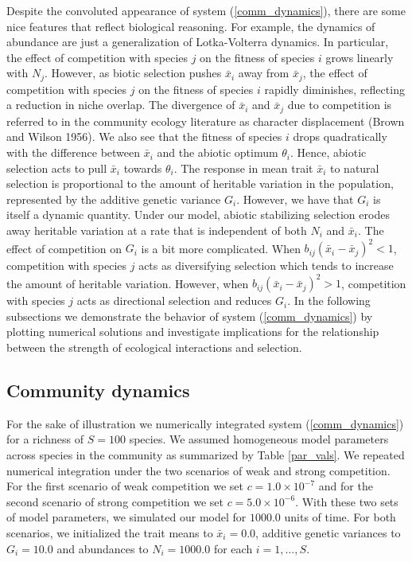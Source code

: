 \documentclass[]{article}
\begin{document}
Despite the convoluted appearance of system (\ref{comm_dynamics}), there
are some nice features that reflect biological reasoning. For example,
the dynamics of abundance are just a generalization of Lotka-Volterra
dynamics. In particular, the effect of competition with species \(j\) on
the fitness of species \(i\) grows linearly with \(N_j\). However, as
biotic selection pushes \(\bar x_i\) away from \(\bar x_j\), the effect
of competition with species \(j\) on the fitness of species \(i\)
rapidly diminishes, reflecting a reduction in niche overlap. The
divergence of \(\bar x_i\) and \(\bar x_j\) due to competition is
referred to in the community ecology literature as character
displacement (Brown and Wilson 1956). We also see that the fitness of
species \(i\) drops quadratically with the difference between
\(\bar x_i\) and the abiotic optimum \(\theta_i\). Hence, abiotic
selection acts to pull \(\bar x_i\) towards \(\theta_i\). The response
in mean trait \(\bar x_i\) to natural selection is proportional to the
amount of heritable variation in the population, represented by the
additive genetic variance \(G_i\). However, we have that \(G_i\) is
itself a dynamic quantity. Under our model, abiotic stabilizing
selection erodes away heritable variation at a rate that is independent
of both \(N_i\) and \(\bar x_i\). The effect of competition on \(G_i\)
is a bit more complicated. When \(b_{ij}(\bar x_i-\bar x_j)^2<1\),
competition with species \(j\) acts as diversifying selection which
tends to increase the amount of heritable variation. However, when
\(b_{ij}(\bar x_i-\bar x_j)^2>1\), competition with species \(j\) acts
as directional selection and reduces \(G_i\). In the following
subsections we demonstrate the behavior of system (\ref{comm_dynamics})
by plotting numerical solutions and investigate implications for the
relationship between the strength of ecological interactions and
selection.

\hypertarget{community-dynamics}{%
\subsection{\texorpdfstring{Community dynamics
\label{dynamics}}{Community dynamics }}\label{community-dynamics}}

For the sake of illustration we numerically integrated system
(\ref{comm_dynamics}) for a richness of \(S=100\) species. We assumed
homogeneous model parameters across species in the community as
summarized by Table \ref{par_vals}. We repeated numerical integration
under the two scenarios of weak and strong competition. For the first
scenario of weak competition we set \(c=1.0\times10^{-7}\) and for the
second scenario of strong competition we set \(c=5.0\times10^{-6}\).
With these two sets of model parameters, we simulated our model for
\(1000.0\) units of time. For both scenarios, we initialized the trait
means to \(\bar x_i=0.0\), additive genetic variances to \(G_i=10.0\)
and abundances to \(N_i=1000.0\) for each \(i=1,\dots,S\).
\end{document}
